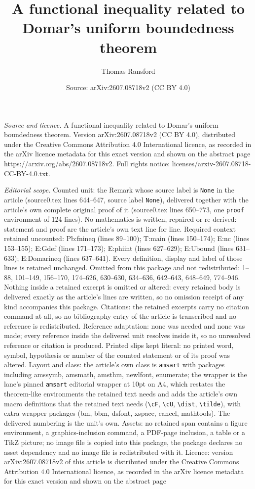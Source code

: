 \documentclass[10pt,a4paper]{amsart}
\title[A functional inequality related to Domar's uniform boundedne]{A functional inequality related to Domar's uniform boundedness theorem}
\author{Thomas Ransford}
\date{Source: arXiv:2607.08718v2 (CC BY 4.0)}
\begin{document}
\maketitle

\noindent\emph{Source and licence.} A functional inequality related to Domar's uniform boundedness theorem. Version arXiv:2607.08718v2 (CC BY 4.0), distributed under the Creative Commons Attribution 4.0 International licence, as recorded in the arXiv licence metadata for this exact version and shown on the abstract page https://arxiv.org/abs/2607.08718v2. Full rights notice: licenses/arxiv-2607.08718-CC-BY-4.0.txt.\par\smallskip

\noindent\textit{Editorial scope.} Counted unit: the Remark whose source label is \texttt{None} in the article (source0.tex lines 644--647, source label \texttt{None}), delivered together with the article's own complete original proof of it (source0.tex lines 650--773, one \texttt{proof} environment of 124 lines). No mathematics is written, repaired or re-derived: statement and proof are the article's own text line for line. Required context retained uncounted: Pb:fnineq (lines 89--100); T:main (lines 150--174); E:nc (lines 153--155); E:Gdef (lines 171--173); E:phiint (lines 627--629); E:Ubound (lines 631--633); E:Domarineq (lines 637--641). Every definition, display and label of those lines is retained unchanged. Omitted from this package and not redistributed: 1--88, 101--149, 156--170, 174--626, 630--630, 634--636, 642--643, 648--649, 774--946. Nothing inside a retained excerpt is omitted or altered: every retained body is delivered exactly as the article's lines are written, so no omission receipt of any kind accompanies this package. Citations: the retained excerpts carry no citation command at all, so no bibliography entry of the article is transcribed and no reference is redistributed. Reference adaptation: none was needed and none was made; every reference inside the delivered unit resolves inside it, so no unresolved reference or citation is produced. Printed slips kept literal: no printed word, symbol, hypothesis or number of the counted statement or of its proof was altered. Layout and class: the article's own class is \texttt{amsart} with packages including amssymb, amsmath, amsthm, newlfont, enumerate; the wrapper is the lane's pinned \texttt{amsart} editorial wrapper at 10pt on A4, which restates the theorem-like environments the retained text needs and adds the article's own macro definitions that the retained text needs (\texttt{\textbackslash cF}, \texttt{\textbackslash cU}, \texttt{\textbackslash dist}, \texttt{\textbackslash tilde}), with extra wrapper packages (bm, bbm, dsfont, xspace, cancel, mathtools). The delivered numbering is the unit's own. Assets: no retained span contains a figure environment, a graphics-inclusion command, a PDF-page inclusion, a table or a TikZ picture; no image file is copied into this package, the package declares no asset dependency and no image file is redistributed with it. Licence: version arXiv:2607.08718v2 of this article is distributed under the Creative Commons Attribution 4.0 International licence, as recorded in the arXiv licence metadata for this exact version and shown on the abstract page 
\end{document}
